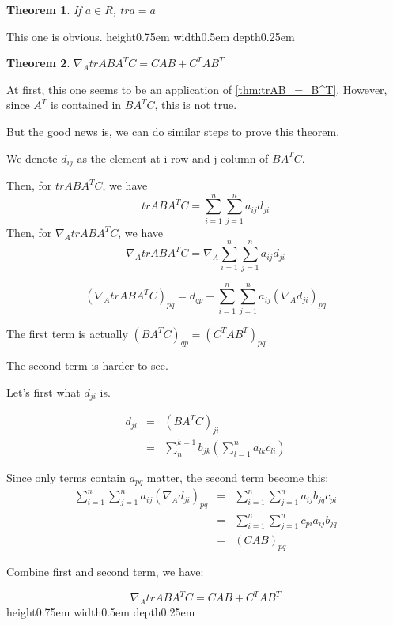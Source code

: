 \documentclass[a4paper]{article}
\newtheorem{theorem}{Theorem}[section]
\newenvironment{proof}[1][Proof]{\begin{trivlist}
\item[\hskip \labelsep {\bfseries #1}]}{\end{trivlist}}
\newcommand{\qed}{\nobreak \ifvmode \relax \else
      \ifdim\lastskip<1.5em \hskip-\lastskip
      \hskip1.5em plus0em minus0.5em \fi \nobreak
      \vrule height0.75em width0.5em depth0.25em\fi}
\begin{document}
\begin{theorem}
	If $a \in R$, $tra = a$
\end{theorem}

\begin{proof}
	This one is obvious.\qed
\end{proof}

\begin{theorem}
	$\nabla_A trABA^TC = CAB + C^TAB^T$
\end{theorem}

\begin{proof}
	At first, this one seems to be an application of
	\cref{thm:trAB_=_B^T}. However, since $A^T$ is contained in $BA^TC$,
	this is not true.

	But the good news is, we can do similar steps to prove this theorem.

	We denote $d_{ij}$ as the element at i row and j column of $BA^TC$.

	Then, for $trABA^TC$, we have
	\begin{displaymath}
		trABA^TC = \sum\limits^{n}_{i=1}\sum\limits^{n}_{j=1}a_{ij}d_{ji}
	\end{displaymath}
	Then, for $\nabla_A trABA^TC$, we have
	\begin{displaymath}
		\nabla_A trABA^TC = \nabla_A \sum\limits^{n}_{i=1}\sum\limits^{n}_{j=1}a_{ij}d_{ji}
	\end{displaymath}

	\begin{displaymath}
		(\nabla_A trABA^TC)_{pq} = d_{qp} +
		\sum\limits^{n}_{i=1}\sum\limits^{n}_{j=1}a_{ij}(\nabla_A
		d_{ji})_{pq}
	\end{displaymath}

	The first term is actually $(BA^TC)_{qp} = (C^TAB^T)_{pq}$

	The second term is harder to see.

	Let's first what $d_{ji}$ is.

	\begin{eqnarray}
		d_{ji}	& = & (BA^TC)_{ji} \nonumber\\
		& = &
		\sum\limits^{k=1}_{n}b_{jk}(\sum\limits^{n}_{l=1}a_{lk}c_{li})
		\nonumber
	\end{eqnarray}

	Since only terms contain $a_{pq}$ matter, the second term become
	this:
	\begin{eqnarray}
		\sum\limits^{n}_{i=1}\sum\limits^{n}_{j=1}a_{ij}(\nabla_A
		d_{ji})_{pq} & = &
				\sum\limits^{n}_{i=1}\sum\limits^{n}_{j=1}a_{ij}b_{jq}c_{pi}
				\nonumber\\
				& = & \sum\limits^{n}_{i=1}\sum\limits^{n}_{j=1}c_{pi}a_{ij}b_{jq}
				\nonumber\\
				& = & (CAB)_{pq} \nonumber
	\end{eqnarray}

	Combine first and second term, we have:

	\begin{displaymath}
		\nabla_A trABA^TC = CAB + C^TAB^T
	\end{displaymath}
	\qed

\end{proof}
\end{document}
